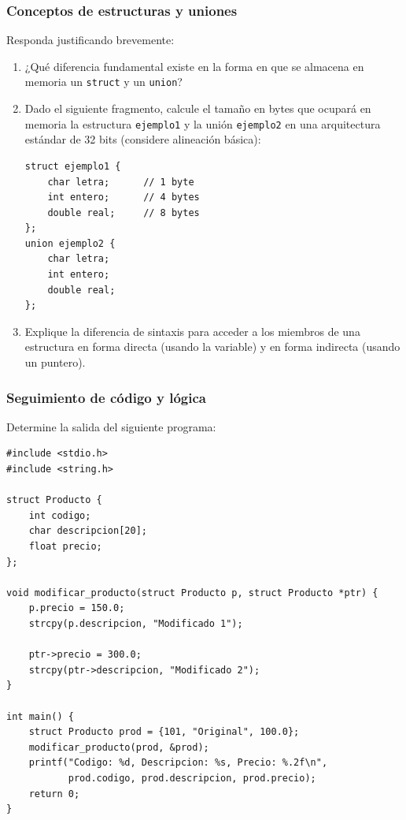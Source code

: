 \begin{ejercicioClase}
    \subsubsection{Conceptos de estructuras y uniones}
    Responda justificando brevemente:
    \begin{enumerate}[label=\alph*)]
        \item ¿Qué diferencia fundamental existe en la forma en que se almacena en memoria un \texttt{struct} y un \texttt{union}? 
        \item Dado el siguiente fragmento, calcule el tamaño en bytes que ocupará en memoria la estructura \texttt{ejemplo1} y la unión \texttt{ejemplo2} en una arquitectura estándar de 32 bits (considere alineación básica):
        \begin{lstlisting}[style=customc, basicstyle=\ttfamily\small]
struct ejemplo1 {
    char letra;      // 1 byte
    int entero;      // 4 bytes
    double real;     // 8 bytes
};
union ejemplo2 {
    char letra;
    int entero;
    double real;
};
        \end{lstlisting}
        \item Explique la diferencia de sintaxis para acceder a los miembros de una estructura en forma directa (usando la variable) y en forma indirecta (usando un puntero).
    \end{enumerate}

    \subsubsection{Seguimiento de código y lógica}
    Determine la salida del siguiente programa:
    \begin{lstlisting}[style=customc, basicstyle=\ttfamily\small]
#include <stdio.h>
#include <string.h>

struct Producto {
    int codigo;
    char descripcion[20];
    float precio;
};

void modificar_producto(struct Producto p, struct Producto *ptr) {
    p.precio = 150.0;
    strcpy(p.descripcion, "Modificado 1");

    ptr->precio = 300.0;
    strcpy(ptr->descripcion, "Modificado 2");
}

int main() {
    struct Producto prod = {101, "Original", 100.0};
    modificar_producto(prod, &prod);
    printf("Codigo: %d, Descripcion: %s, Precio: %.2f\n",
           prod.codigo, prod.descripcion, prod.precio);
    return 0;
}
    \end{lstlisting}


\end{ejercicioClase}
